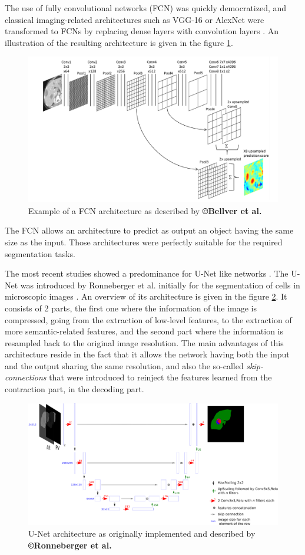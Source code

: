\documentclass[]{article}
\begin{document}
	The use of fully convolutional networks (FCN) was quickly democratized,
	and classical imaging-related architectures such as VGG-16 or AlexNet
	were transformed to FCNs by replacing dense layers with convolution
	layers \cite{Ben-Cohen, Bellver2017}. An illustration of the resulting architecture is given in the figure \ref{Bellver_FCN}. 
	
	\begin{figure}[th!]
		\centering
		\includegraphics[width=0.7\linewidth]{images/image3}
		\caption{Example of a FCN architecture as described by \textbf{©Bellver et al.} \cite{Bellver2017}}
		\label{Bellver_FCN}
	\end{figure}
	
	
	The FCN allows an architecture to predict as output an object having the
	same size as the input. Those architectures were perfectly suitable for
	the required segmentation tasks.
	
	The most recent studies showed a predominance for U-Net like networks \cite{Vorontsov2018, Yuan2017}. The U-Net was
	introduced by Ronneberger et al. initially for the segmentation of cells
	in microscopic images \cite{Ronneberger2015}. An overview of its architecture is given in the
	figure \ref{U_Net_Figure}. It consists of 2 parts, the first one where the
	information of the image is compressed, going from the extraction of
	low-level features, to the extraction of more semantic-related features,
	and the second part where the information is resampled back to the
	original image resolution. The main advantages of this architecture
	reside in the fact that it allows the network having both the input and
	the output sharing the same resolution, and also the so-called
	\emph{skip-connections} that were introduced to reinject the features
	learned from the contraction part, in the decoding part.
	
	\begin{figure}[th!]
		\centering
		\includegraphics[width=0.7\linewidth]{images/image28}
		\caption{U-Net architecture as originally implemented and described by \textbf{©Ronneberger et al.} \cite{Ronneberger2015}}
		\label{U_Net_Figure}
	\end{figure}
	
\end{document}
